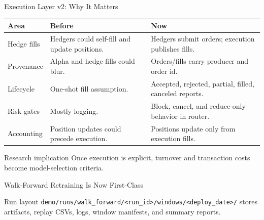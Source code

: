 \documentclass[11pt,aspectratio=169]{beamer}
\newcommand{\1}{\mathbf{1}}
\begin{document}
\begin{frame}{Execution Layer v2: Why It Matters}
    \small
    \begin{center}
    \renewcommand{\arraystretch}{1.18}
    \begin{tabular}{p{}p{}p{}}
    \toprule
    \textbf{Area} & \textbf{Before} & \textbf{Now} \\
    \midrule
    Hedge fills & Hedgers could self-fill and update positions. & Hedgers submit orders; execution publishes fills. \\
    Provenance & Alpha and hedge fills could blur. & Orders/fills carry producer and order id. \\
    Lifecycle & One-shot fill assumption. & Accepted, rejected, partial, filled, canceled reports. \\
    Risk gates & Mostly logging. & Block, cancel, and reduce-only behavior in router. \\
    Accounting & Position updates could precede execution. & Positions update only from execution fills. \\
    \bottomrule
    \end{tabular}
    \end{center}
    \begin{alertblock}{Research implication}
    Once execution is explicit, turnover and transaction costs become model-selection criteria.
    \end{alertblock}
\end{frame}

\begin{frame}{Walk-Forward Retraining Is Now First-Class}
    \small
    \begin{center}
    \end{center}
    \begin{block}{Run layout}
    \texttt{demo/runs/walk\_forward/<run\_id>/windows/<deploy\_date>/}
    stores artifacts, replay CSVs, logs, window manifests, and summary reports.
    \end{block}
\end{frame}
\end{document}
